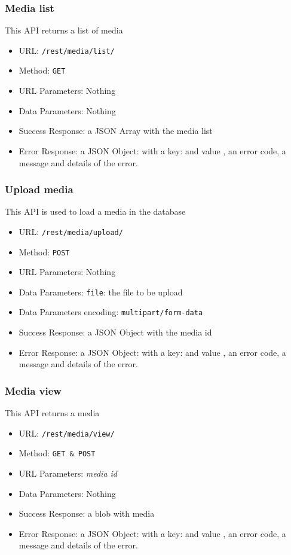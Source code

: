 \subsubsection*{Media list}

This API returns a list of media

\begin{itemize}
    \item URL: \texttt{/rest/media/list/}
    \item Method: \texttt{GET}
    \item URL Parameters: Nothing
    \item Data Parameters: Nothing
    \item Success Response: a JSON Array with the media list
    \item Error Response: a JSON Object: with a key:   and value , an error code, a message and details of the error.
\end{itemize}

\subsubsection*{Upload media}

This API is used to load a media in the database

\begin{itemize}
    \item URL: \texttt{/rest/media/upload/}
    \item Method: \texttt{POST}
    \item URL Parameters: Nothing
    \item Data Parameters: \texttt{file}: the file to be upload
    \item Data Parameters encoding: \texttt{multipart/form-data}
    \item Success Response: a JSON Object with the media id
    \item Error Response: a JSON Object: with a key:   and value , an error code, a message and details of the error.
\end{itemize}

\subsubsection*{Media view}

This API returns a media

\begin{itemize}
    \item URL: \texttt{/rest/media/view/}
    \item Method: \texttt{GET \& POST}
    \item URL Parameters: \textit{media id}
    \item Data Parameters: Nothing
    \item Success Response: a blob with media
    \item Error Response: a JSON Object: with a key:   and value , an error code, a message and details of the error.
\end{itemize}

